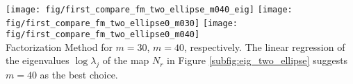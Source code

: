 \documentclass[10pt]{beamer}
\theoremstyle{plain}
\theoremstyle{plain}
\begin{document}
\begin{frame}
 \frametitle{}
{
\texttt{[image: fig/first\_compare\_fm\_two\_ellipse\_m040\_eig]}
}
{
\texttt{[image: fig/first\_compare\_fm\_two\_ellipse0\_m030]}
}
{
\texttt{[image: fig/first\_compare\_fm\_two\_ellipse0\_m040]}
}\\
Factorization Method for $m=30$, $m=40$, respectively. The linear regression of the
eigenvalues $\log\lambda_j$ of the map $N_r$ in Figure \ref{subfig:eig_two_ellipse} suggests $m=40$ as the best choice.
\end{frame}
\begin{frame}
 \frametitle{}
\end{frame}
\begin{frame}
 \frametitle{}
\end{frame}
\begin{frame}
 \frametitle{}
\end{frame}
\begin{frame}
 \frametitle{}
\end{frame}
\begin{frame}
 \frametitle{}
\end{frame}
\end{document}
